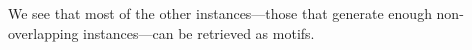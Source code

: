 \documentclass[runningheads]{style/llncs}
\begin{document}
We see that most of the other instances---those that generate enough non-overlapping instances---can be retrieved as motifs. 

\end{document}
